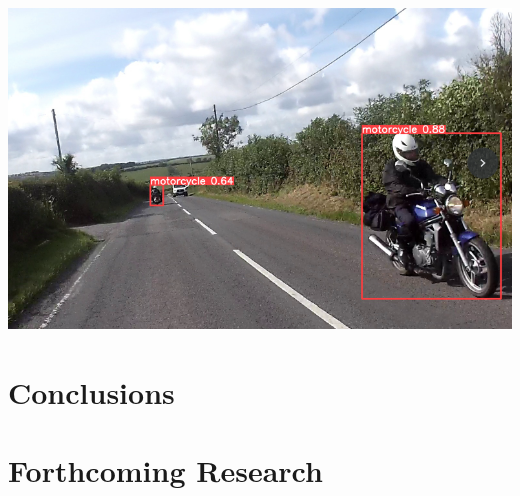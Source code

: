 \documentclass[a0,portrait]{a0poster}
\begin{document}
\begin{multicols}{2}
\begin{center}
\begin{minipage}{0.15\textwidth}
					\centering
					\includegraphics[width=\linewidth]{motorcycle.png}
					\label{fig:lateClassificationP2}
				\end{minipage}\vspace{1cm}
			\end{center}\vspace{1cm}


	\color{DarkRed} %

	\section*{Conclusions}


	\color{DarkSlateGray} %


	\section*{Forthcoming Research}



\end{multicols}
\end{document}
